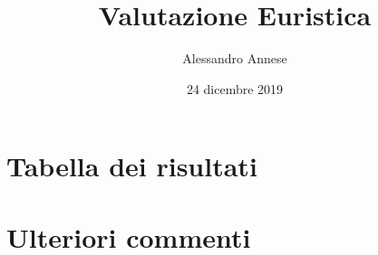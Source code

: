 \documentclass[french]{article}
\title{Valutazione Euristica}
\author{Alessandro Annese}
\date{24 dicembre 2019}
\begin{document}
\maketitle

\section{Tabella dei risultati}



\section{Ulteriori commenti}
\end{document}
